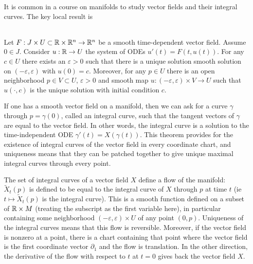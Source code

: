 It is common in a course on manifolds to study vector fields and their integral curves.
The key local result is
\begin{theorem}
\textup{\cite[Theorem~2.1.1]{Sharpe1997}}\cite[Theorem~1.2.1]{Ivey2016} \\
Let $F : J \times U \subset \mathbb{R}\times\mathbb{R}^n \to \mathbb{R}^n$ be a smooth time-dependent vector field. 
Assume $0 \in J$. 
Consider $u : \mathbb{R} \to U$ the system of ODEs $u'(t) = F(t,u(t))$.
For any $c \in U$ there exists an $\varepsilon > 0$ such that there is a unique solution smooth solution on $(-\varepsilon,\varepsilon)$ with $u(0) = c$.
Moreover, for any $p \in U$ there is an open neighborhood $p \in V \subset U$, $\varepsilon > 0$ and smooth map $u : (-\varepsilon,\varepsilon) \times V \to U$ such that $u(\cdot,c)$ is the unique solution with initial condition $c$.
\end{theorem}

If one has a smooth vector field on a manifold, then we can ask for a curve $\gamma$ through $p = \gamma(0)$, called an integral curve, such that the tangent vectors of $\gamma$ are equal to the vector field.
In other words, the integral curve is a solution to the time-independent ODE $\gamma'(t) = X(\gamma(t))$.
This theorem provides for the existence of integral curves of the vector field in every coordinate chart, and uniqueness means that they can be patched together to give unique maximal integral curves through every point.

The set of integral curves of a vector field $X$ define a flow of the manifold: $\tilde{X}_t(p)$ is defined to be equal to the integral curve of $X$ through $p$ at time $t$ (ie $t \mapsto \tilde{X}_t(p)$ is the integral curve).
This is a smooth function defined on a subset of $\mathbb{R} \times M$ (treating the subscript as the first variable here), in particular containing some neighborhood $(-\varepsilon,\varepsilon) \times U$ of any point $(0,p)$.
Uniqueness of the integral curves means that this flow is reversible.
Moreover, if the vector field is nonzero at a point, there is a chart containing that point where the vector field is the first coordinate vector $\partial_1$ and the flow is translation.
In the other direction, the derivative of the flow with respect to $t$ at $t=0$ gives back the vector field $X$.

